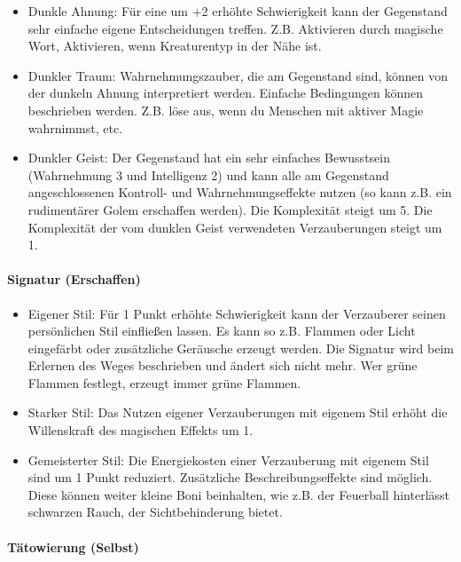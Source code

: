 \documentclass{article}
\begin{document}
\begin{itemize}
\item Dunkle Ahnung: Für eine um +2 erhöhte Schwierigkeit kann der Gegenstand sehr einfache eigene Entscheidungen treffen. Z.B. Aktivieren durch magische Wort, Aktivieren, wenn Kreaturentyp in der Nähe ist.
\item Dunkler Traum: Wahrnehmungszauber, die am Gegenstand sind, können von der dunkeln Ahnung interpretiert werden. Einfache Bedingungen können beschrieben werden. Z.B. löse aus, wenn du Menschen mit aktiver Magie wahrnimmst, etc.
\item Dunkler Geist: Der Gegenstand hat ein sehr einfaches Bewusstsein (Wahrnehmung 3 und Intelligenz 2) und kann alle am Gegenstand angeschlossenen Kontroll- und Wahrnehmungseffekte nutzen (so kann z.B. ein rudimentärer Golem erschaffen werden). Die Komplexität steigt um 5. Die Komplexität der vom dunklen Geist verwendeten Verzauberungen steigt um 1.
\end{itemize}

\paragraph{Signatur (Erschaffen)}

\begin{itemize}
\item Eigener Stil: Für 1 Punkt erhöhte Schwierigkeit kann der Verzauberer seinen persönlichen Stil einfließen lassen. Es kann so z.B. Flammen oder Licht eingefärbt oder zusätzliche Geräusche erzeugt werden. Die Signatur wird beim Erlernen des Weges beschrieben und ändert sich nicht mehr. Wer grüne Flammen festlegt, erzeugt immer grüne Flammen.
\item Starker Stil: Das Nutzen eigener Verzauberungen mit eigenem Stil erhöht die Willenskraft des magischen Effekts um 1.
\item Gemeisterter Stil: Die Energiekosten einer Verzauberung mit eigenem Stil sind um 1 Punkt reduziert. Zusätzliche Beschreibungseffekte sind möglich. Diese können weiter kleine Boni beinhalten, wie z.B. der Feuerball hinterlässt schwarzen Rauch, der Sichtbehinderung bietet.
\end{itemize}

\paragraph{Tätowierung (Selbst)}
\end{document}
